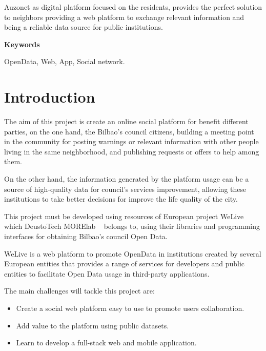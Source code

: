 \documentclass{DeustoFDP}
\begin{document}
Auzonet as digital platform focused on the residents, provides the perfect solution to neighbors providing a web platform to exchange relevant information and being a reliable data source for public institutions.

\vspace{2em}

{\Large\bfseries\sectionfont Keywords}
\vspace{3\medskipamount}

OpenData, Web, App, Social network.

\cleardoublepage\tableofcontents
\cleardoublepage\listoffigures
\cleardoublepage\listoftables
\cleardoublepage\listoflistings

\mainmatter
\pagestyle{phdthesis}

\chapter{Introduction}\label{cha:introduction}
The aim of this project is create an online social platform for benefit different parties, on the one hand, the Bilbao's council citizens, building a meeting point in the community for posting warnings or relevant information with other people living in the same neighborhood, and publishing requests or offers to help among them.

On the other hand, the information generated by the platform usage can be a source of high-quality data for council's services improvement, allowing these institutions to take better decisions for improve the life quality of the city.

This project must be developed using resources of European project WeLive ~\cite{WeLive} which DeustoTech \cite{DeustoTech} MORElab ~\cite{Morelab} belongs to, using their libraries and programming interfaces for obtaining Bilbao's council Open Data. 

WeLive is a web platform to promote OpenData in institutions created by several European entities \cite{WeLiveConsortium} that provides a range of services for developers and public entities to facilitate Open Data usage in third-party applications.

The main challenges will tackle this project are:

\begin{itemize}
    \item Create a social web platform easy to use to promote users collaboration.
    \item Add value to the platform using public datasets.
    \item Learn to develop a full-stack web and mobile application.
\end{itemize}
\end{document}
